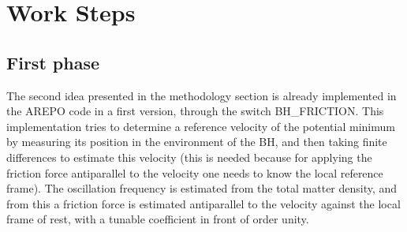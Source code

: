 \documentclass[a4,useAMS,usenatbib,usegraphicx,12pt]{article}
\begin{document}
\section{Work Steps}

\subsection*{First phase}

The second idea presented in the methodology section is already implemented in 
the AREPO code in a first version, through the switch BH\_FRICTION. This 
implementation tries to determine a reference velocity of the potential minimum 
by measuring its position in the environment of the BH, and then taking finite 
differences to estimate this velocity (this is needed because for applying the 
friction force antiparallel to the velocity one needs to know the local reference 
frame). The oscillation frequency is estimated from the total matter density, 
and from this a friction force is estimated antiparallel to the velocity against 
the local frame of rest, with a tunable coefficient in front of order unity.
\end{document}
